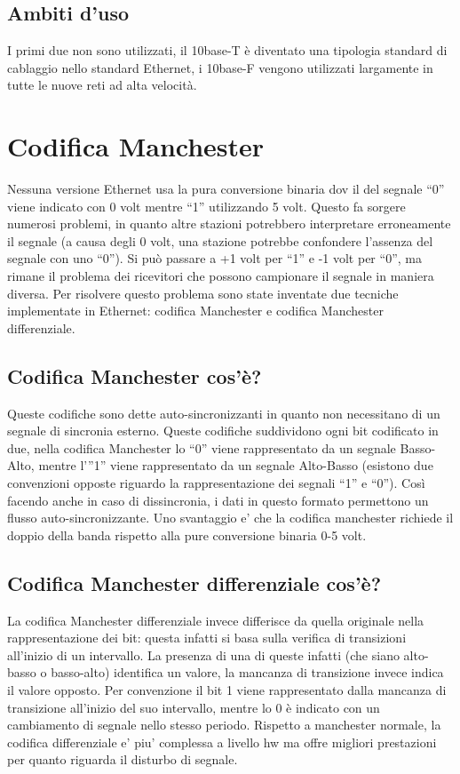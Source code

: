 \subsection{Ambiti d'uso}
I primi due non sono utilizzati, il 10base-T è diventato una tipologia standard di cablaggio nello standard Ethernet, i 10base-F vengono utilizzati largamente in tutte le nuove reti ad alta velocità.

\section{Codifica Manchester}

Nessuna versione Ethernet usa la pura conversione binaria dov il del segnale “0” viene indicato con 0 volt mentre “1” utilizzando 5 volt. Questo fa sorgere numerosi problemi, in quanto altre stazioni potrebbero interpretare erroneamente il segnale (a causa degli 0 volt, una stazione potrebbe confondere l'assenza del segnale con uno “0”). Si può passare a +1 volt per “1” e -1 volt per “0”, ma rimane il problema dei ricevitori che possono campionare il segnale in maniera diversa.
Per risolvere questo problema sono state inventate due tecniche implementate in Ethernet: codifica Manchester e codifica Manchester differenziale.
\subsection{Codifica Manchester cos'è?}
Queste codifiche sono dette auto-sincronizzanti in quanto non necessitano di un segnale di sincronia esterno.
Queste codifiche suddividono ogni bit codificato in due, nella codifica Manchester lo “0” viene rappresentato da un segnale Basso-Alto, mentre l'”1” viene rappresentato da un segnale Alto-Basso (esistono due convenzioni opposte riguardo la rappresentazione dei segnali “1” e “0”).
Così facendo anche in caso di dissincronia, i dati in questo formato permettono un flusso auto-sincronizzante. Uno svantaggio e' che la codifica manchester richiede il doppio della banda rispetto alla pure conversione binaria 0-5 volt.
\subsection{Codifica Manchester differenziale cos'è?}
La codifica Manchester differenziale invece differisce da quella originale nella rappresentazione dei bit: questa infatti si basa sulla verifica di transizioni all'inizio di un intervallo. La presenza di una di queste infatti (che siano alto-basso o basso-alto) identifica un valore, la mancanza di transizione invece indica il valore opposto. Per convenzione il bit 1 viene rappresentato dalla mancanza di transizione all'inizio del suo intervallo, mentre lo 0 è indicato con un cambiamento di segnale nello stesso periodo. Rispetto a manchester normale, la codifica differenziale e' piu' complessa a livello hw ma offre migliori prestazioni per quanto riguarda il disturbo di segnale.

